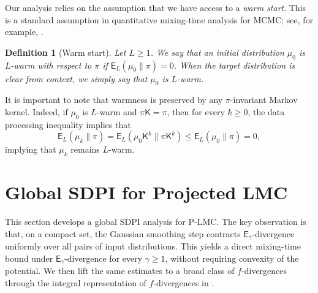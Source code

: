 \documentclass[10pt, journal]{IEEEtran}
\makeatletter
\def\eqref#1{equation~\ref{#1}}
\renewcommand{\eqref}[1]{\textup{\tagform@{\ref{#1}}}}
\newcommand{\sE}{\mathsf{E}}
\newcommand{\sK}{\mathsf{K}}
\newtheorem{definition}{Definition}
\makeatother
\begin{document}
Our analysis relies on the assumption that we have access to a \textit{warm start}. This is a standard assumption in quantitative mixing-time analysis for MCMC; see, for example, \cite{dwivedi2019log,mangoubi2019nonconvex,chewi2021optimal}. 
\begin{definition}[Warm start] Let $L\ge 1$. We say that an initial distribution $\mu_0$ is $L$-warm with respect to $\pi$ if $\mathsf E_L(\mu_0\|\pi)=0$. When the target distribution is clear from context, we simply say that $\mu_0$ is $L$-warm. 
\end{definition} 
It is important to note that warmness is preserved by any $\pi$-invariant Markov kernel. Indeed, if $\mu_0$ is $L$-warm  and $\pi\sK=\pi$, then for every $k\ge0$, the data processing inequality implies that 
$$\sE_L(\mu_k\|\pi) = \sE_L(\mu_0\sK^k\|\pi\sK^k)\leq \sE_L(\mu_0\|\pi)= 0,$$
implying that $\mu_k$ remains $L$-warm.  



\section{Global SDPI for Projected LMC}
\label{sec:plmc-global-sdpi}

This section develops a global SDPI analysis for P-LMC. The key observation is that, on a compact set, the Gaussian smoothing step contracts $\mathsf E_\gamma$-divergence uniformly over all pairs of input distributions. This yields a direct mixing-time bound under $\mathsf E_\gamma$-divergence for every $\gamma\ge 1$, without requiring convexity of the potential. We then lift the same estimates to a broad class of $f$-divergences through the integral representation of $f$-divergences in \eqref{f_representation}. 
\end{document}
